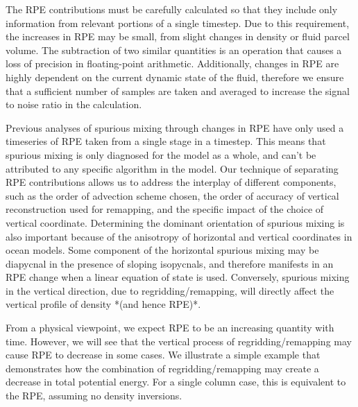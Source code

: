 The RPE contributions must be carefully calculated so that they include only information from relevant portions of a single timestep. Due to this requirement, the increases in RPE may be small, from slight changes in density or fluid parcel volume. The subtraction of two similar quantities is an operation that causes a loss of precision in floating-point arithmetic. Additionally, changes in RPE are highly dependent on the current dynamic state of the fluid, therefore we ensure that a sufficient number of samples are taken and averaged to increase the signal to noise ratio in the calculation.


Previous analyses of spurious mixing through changes in RPE have only used a timeseries of RPE taken from a single stage in a timestep. This means that spurious mixing is only diagnosed for the model as a whole, and can't be attributed to any specific algorithm in the model. Our technique of separating RPE contributions allows us to address the interplay of different components, such as the order of advection scheme chosen, the order of accuracy of vertical reconstruction used for remapping, and the specific impact of the choice of vertical coordinate. Determining the dominant orientation of spurious mixing is also important because of the anisotropy of horizontal and vertical coordinates in ocean models. Some component of the horizontal spurious mixing may be diapycnal in the presence of sloping isopycnals, and therefore manifests in an RPE change when a linear equation of state is used. Conversely, spurious mixing in the vertical direction, due to regridding/remapping, will directly affect the vertical profile of density *(and hence RPE)*.


From a physical viewpoint, we expect RPE to be an increasing quantity with time. However, we will see that the vertical process of regridding/remapping may cause RPE to decrease in some cases. We illustrate a simple example that demonstrates how the combination of regridding/remapping may create a decrease in total potential energy. For a single column case, this is equivalent to the RPE, assuming no density inversions.

